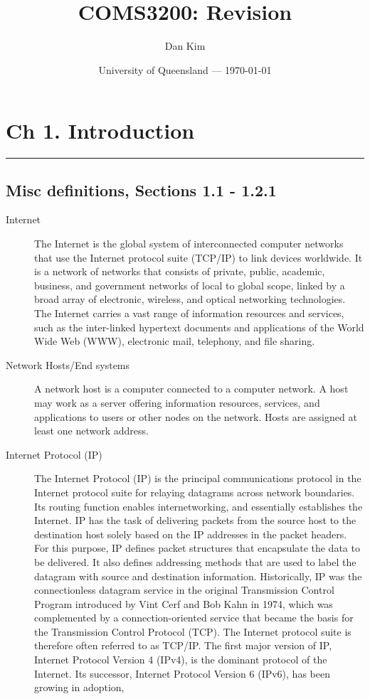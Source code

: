 \documentclass{article}
\title{COMS3200: Revision} %
\author{Dan Kim}
\date{University of Queensland --- \today}
\begin{document}
\maketitle %

\section*{Ch 1. Introduction}
\noindent
\rule{\linewidth}{0.5mm}
\noindent

\subsection*{Misc definitions, Sections 1.1 - 1.2.1}
\begin{description}
    \item[Internet] The Internet is the global system of interconnected computer networks that use the Internet protocol suite (TCP/IP) to link devices worldwide. It is a network of networks that consists of private, public, academic, business, and government networks of local to global scope, linked by a broad array of electronic, wireless, and optical networking technologies. The Internet carries a vast range of information resources and services, such as the inter-linked hypertext documents and applications of the World Wide Web (WWW), electronic mail, telephony, and file sharing.
    
    \item[Network Hosts/End systems] A network host is a computer connected to a computer network. A host may work as a server offering information resources, services, and applications to users or other nodes on the network. Hosts are assigned at least one network address.
    
    \item[Internet Protocol (IP)] The Internet Protocol (IP) is the principal communications protocol in the Internet protocol suite for relaying datagrams across network boundaries. Its routing function enables internetworking, and essentially establishes the Internet. IP has the task of delivering packets from the source host to the destination host solely based on the IP addresses in the packet headers. For this purpose, IP defines packet structures that encapsulate the data to be delivered. It also defines addressing methods that are used to label the datagram with source and destination information. Historically, IP was the connectionless datagram service in the original Transmission Control Program introduced by Vint Cerf and Bob Kahn in 1974, which was complemented by a connection-oriented service that became the basis for the Transmission Control Protocol (TCP). The Internet protocol suite is therefore often referred to as TCP/IP. The first major version of IP, Internet Protocol Version 4 (IPv4), is the dominant protocol of the Internet. Its successor, Internet Protocol Version 6 (IPv6), has been growing in adoption, 


\end{description}
\end{document}
